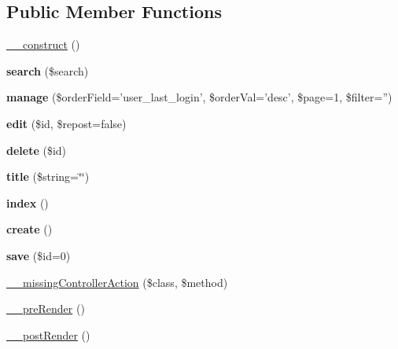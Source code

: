 \subsection*{Public Member Functions}
\begin{DoxyCompactItemize}
\item 
\hyperlink{class_users_controller_a095c5d389db211932136b53f25f39685}{\_\-\_\-construct} ()
\item 
\hypertarget{class_users_controller_a0d624b549023221829714196e71f38da}{
{\bfseries search} (\$search)}
\label{class_users_controller_a0d624b549023221829714196e71f38da}

\item 
\hypertarget{class_users_controller_a7826dc4ab0ec0e30ec0378fa740cdb3c}{
{\bfseries manage} (\$orderField='user\_\-last\_\-login', \$orderVal='desc', \$page=1, \$filter='')}
\label{class_users_controller_a7826dc4ab0ec0e30ec0378fa740cdb3c}

\item 
\hypertarget{class_users_controller_a3e2ca5065723bc35286c37f76b86fac2}{
{\bfseries edit} (\$id, \$repost=false)}
\label{class_users_controller_a3e2ca5065723bc35286c37f76b86fac2}

\item 
\hypertarget{class_users_controller_a2f8258add505482d7f00ea26493a5723}{
{\bfseries delete} (\$id)}
\label{class_users_controller_a2f8258add505482d7f00ea26493a5723}

\item 
\hypertarget{class_table_controller_a09086607bdf0caa184393e8fa08a55bc}{
{\bfseries title} (\$string=\char`\"{}\char`\"{})}
\label{class_table_controller_a09086607bdf0caa184393e8fa08a55bc}

\item 
\hypertarget{class_table_controller_a149eb92716c1084a935e04a8d95f7347}{
{\bfseries index} ()}
\label{class_table_controller_a149eb92716c1084a935e04a8d95f7347}

\item 
\hypertarget{class_table_controller_a435e7d7525d4bcd0ed5e34a469f3adf6}{
{\bfseries create} ()}
\label{class_table_controller_a435e7d7525d4bcd0ed5e34a469f3adf6}

\item 
\hypertarget{class_table_controller_a1a4fb85b713fd3fae33e237428c918f3}{
{\bfseries save} (\$id=0)}
\label{class_table_controller_a1a4fb85b713fd3fae33e237428c918f3}

\item 
\hyperlink{class_controller_a728c573e418d1f979340a4669524cacd}{\_\-\_\-missingControllerAction} (\$class, \$method)
\item 
\hyperlink{class_controller_ad86994d2463ea27cab892176e6509bdb}{\_\-\_\-preRender} ()
\item 
\hyperlink{class_controller_adc3c9cc4788f7ba7d1368fdc43568b1d}{\_\-\_\-postRender} ()
\end{DoxyCompactItemize}
